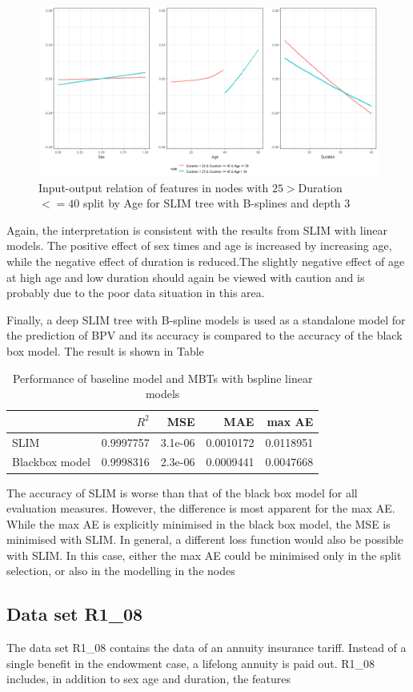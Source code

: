 \begin{figure}[!htb]
    \centering    
    \includegraphics[width = 16cm]{Figures/insurance_use_case/k2204_BPV/effects_age_medium_duration.png}
    \caption{Input-output relation of features in nodes with $25 > $Duration $<= 40$ split by Age for SLIM tree with B-splines and depth 3}
    \label{fig:ins_k2204_effects_age_medium_duration}
\end{figure}

Again, the interpretation is consistent with the results from SLIM with linear models. The positive effect of sex times and age is increased by increasing age, while the negative effect of duration is reduced.The slightly negative effect of age at high age and low duration should again be viewed with caution and is probably due to the poor data situation in this area.


Finally, a deep SLIM tree with B-spline models is used as a standalone model for the prediction of BPV and its accuracy is compared to the accuracy of the black box model. The result is shown in Table


\begin{table}

\caption{Performance of baseline model and MBTs with bspline linear models}
\centering
\begin{tabular}[t]{l|r|r|r|r}
\hline
  & $R^2$ & MSE & MAE & max AE \\
\hline
SLIM & 0.9997757 & 3.1e-06 & 0.0010172 & 0.0118951\\
Blackbox model & 0.9998316 & 2.3e-06 & 0.0009441 & 0.0047668\\
\hline
\end{tabular}
\end{table}

The accuracy of SLIM is worse than that of the black box model for all evaluation measures. However, the difference is most apparent for the max AE. While the max AE is explicitly minimised in the black box model, the MSE is minimised with SLIM. In general, a different loss function would also be possible with SLIM. In this case, either the max AE could be minimised only in the split selection, or also in the modelling in the nodes






\subsection{Data set R1\_08}

The data set R1\_08 contains the data of an annuity insurance tariff. Instead of a single benefit in the endowment case, a lifelong annuity is paid out.
R1\_08 includes, in addition to sex age and duration, the features 



